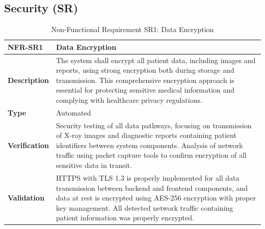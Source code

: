 \documentclass[12pt, titlepage]{article}
\begin{document}
\subsection{Security (SR)}
\begin{table}[H]
\centering
{}
\begin{tabular}{|p{3.5cm}|p{11.5cm}|}
\hline
\rowcolor{gray!30}
\textbf{NFR-SR1} & \textbf{Data Encryption} \\
\hline
\textbf{Description} & The system shall encrypt all patient data, including images and reports, using strong encryption both during storage and transmission. This comprehensive encryption approach is essential for protecting sensitive medical information and complying with healthcare privacy regulations. \\
\hline
\textbf{Type} & Automated \\
\hline
\textbf{Verification} & Security testing of all data pathways, focusing on transmission of X-ray images and diagnostic reports containing patient identifiers between system components. Analysis of network traffic using packet capture tools to confirm encryption of all sensitive data in transit. \\
\hline
\textbf{Validation} & HTTPS with TLS 1.3 is properly implemented for all data transmission between backend and frontend components, and data at rest is encrypted using AES-256 encryption with proper key management. All detected network traffic containing patient information was properly encrypted. \\
\hline
\end{tabular}
\caption{Non-Functional Requirement SR1: Data Encryption}
\end{table}
\end{document}
